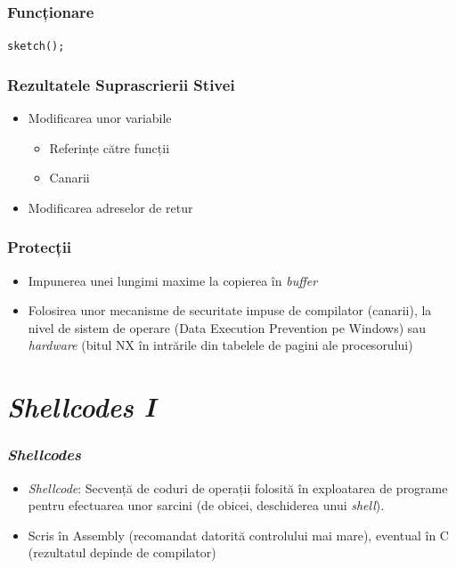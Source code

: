 \documentclass[xcolor={table}]{beamer}
\begin{document}
	\begin{frame}
		\frametitle{Funcționare}\pause
		\centering
        \texttt{sketch();}
	\end{frame}
	
	\begin{frame}
		\frametitle{Rezultatele Suprascrierii Stivei}\pause
		\begin{itemize}[<+->]
			\item Modificarea unor variabile
			    \begin{itemize}
        			\item Referințe către funcții
        			\item Canarii
        		\end{itemize}
        	\item Modificarea adreselor de retur
		\end{itemize}
	\end{frame}
	
	\begin{frame}
		\frametitle{Protecții}\pause
		\begin{itemize}[<+->]
			\item Impunerea unei lungimi maxime la copierea în \textit{buffer}
			\item Folosirea unor mecanisme de securitate impuse de compilator (canarii), la nivel de sistem de operare (Data Execution Prevention pe Windows) sau \textit{hardware} (bitul NX în intrările din tabelele de pagini ale procesorului)
		\end{itemize}
	\end{frame}
	
	\section{\textit{Shellcodes I}}

	\begin{frame}
		\frametitle{\textit{Shellcodes}}\pause
		\begin{itemize}[<+->]
			\item \textit{\textit{Shellcode}}: Secvență de coduri de operații folosită în exploatarea de programe pentru efectuarea unor sarcini (de obicei, deschiderea unui \textit{shell}).
			\item Scris în Assembly (recomandat datorită controlului mai mare), eventual în C (rezultatul depinde de compilator)
		\end{itemize}
	\end{frame}
	
\end{document}
